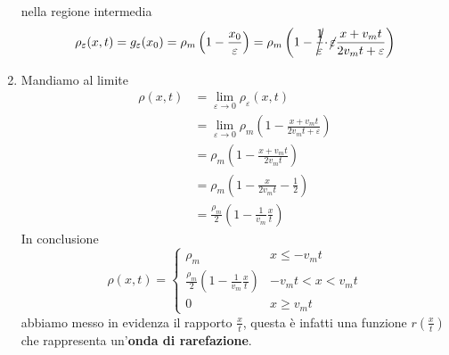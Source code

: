 \begin{enumerate}

          nella regione intermedia
          \begin{equation*}
              \rho _{\varepsilon }(x,t) =g_{\varepsilon }(x_{0}) =\rho _{m}\left(1-\frac{x_{0}}{\varepsilon }\right) =\rho _{m}\left(1-\cancel{\frac{1}{\varepsilon }} \cdotp \cancel{\varepsilon }\frac{x+v_{m} t}{2v_{m} t+\varepsilon }\right)
          \end{equation*}
    \item Mandiamo al limite
          \begin{align*}
              \rho (x,t) & =\lim _{\varepsilon \rightarrow 0} \rho _{\varepsilon }(x,t)                                       \\
                         & =\lim _{\varepsilon \rightarrow 0} \rho _{m}\left(1-\frac{x+v_{m} t}{2v_{m} t+\varepsilon }\right) \\
                         & =\rho _{m}\left(1-\frac{x+v_{m} t}{2v_{m} t}\right)                                                \\
                         & =\rho _{m}\left(1-\frac{x}{2v_{m} t} -\frac{1}{2}\right)                                           \\
                         & =\frac{\rho _{m}}{2}\left(1-\frac{1}{v_{m}}\frac{x}{t}\right)
          \end{align*}
          In conclusione
          \begin{equation*}
              \rho (x,t) = \begin{cases}
                  \rho _{m}                                                     & x\le -v_{m}t         \\
                  \frac{\rho _{m}}{2}\left(1-\frac{1}{v_{m}}\frac{x}{t} \right) & -v_{m}t < x < v_{m}t \\
                  0                                                             & x\geq v_{m}t
              \end{cases}
          \end{equation*}
          abbiamo messo in evidenza il rapporto $\frac{x}{t}$, questa è infatti una funzione $r\left(\frac{x}{t}\right)$ che rappresenta un'\textbf{onda di rarefazione}.
\end{enumerate}


